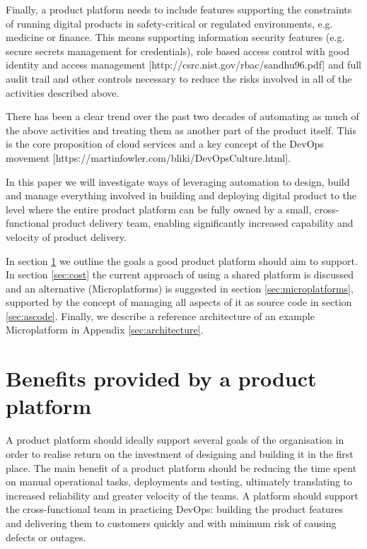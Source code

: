 \documentclass[reprint,amsmath,amssymb,aps]{revtex4-1}
\begin{document}
Finally, a product platform needs to include features supporting the constraints of running digital products in safety-critical or regulated environments, e.g. medicine or finance. This means supporting information security features (e.g. secure secrets management for credentials), role based access control with good identity and access management [http://csrc.nist.gov/rbac/sandhu96.pdf] and full audit trail and other controls necessary to reduce the risks involved in all of the activities described above.

There has been a clear trend over the past two decades of automating as much of the above activities and treating them as another part of the product itself. This is the core proposition of cloud services and a key concept of the DevOps movement [https://martinfowler.com/bliki/DevOpsCulture.html].

In this paper we will investigate ways of leveraging automation to design, build and manage everything involved in building and deploying digital product to the level where the entire product platform can be fully owned by a small, cross-functional product delivery team, enabling significantly increased capability and velocity of product delivery. 

In section \ref{sec:benefits} we outline the goals a good product platform should aim to support. In section \ref{sec:cost} the current approach of using a shared platform is discussed and an alternative (Microplatforms) is suggested in section \ref{sec:microplatforms}, supported by the concept of managing all aspects of it as source code in section \ref{sec:ascode}. Finally, we describe a reference architecture of an example Microplatform in Appendix \ref{sec:architecture}.


\section{Benefits provided by a product platform}
\label{sec:benefits}

A product platform should ideally support several goals of the organisation in order to realise return on the investment of designing and building it in the first place. The main benefit of a product platform should be reducing the time spent on manual operational tasks, deployments and testing, ultimately translating to increased reliability and greater velocity of the teams. A platform should support the cross-functional team in practicing DevOps: building the product features and delivering them to customers quickly and with minimum risk of causing defects or outages.
\end{document}
